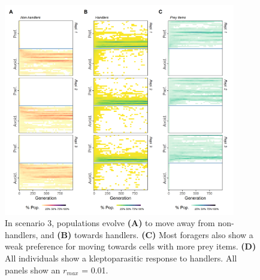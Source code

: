 \documentclass[11pt]{article}
\begin{document}
\begin{figure}[h!]
        \centering
        \includegraphics*[width=0.9\textwidth]{figures/fig_wt_evo_foragers.png}
        \caption{In scenario 3, populations evolve \textbf{(A)} to move away from non-handlers, and \textbf{(B)} towards handlers.
        \textbf{(C)} Most foragers also show a weak preference for moving towards cells with more prey items.
        \textbf{(D)} All individuals show a kleptoparasitic response to handlers.
        All panels show an $r_{max}$ = 0.01.}
\end{figure}
\end{document}
